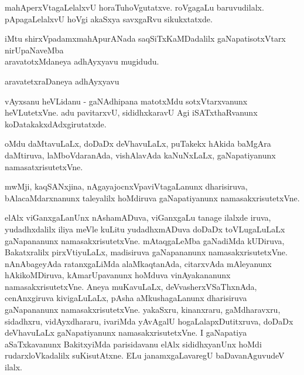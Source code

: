 \documentclass{article}
\begin{document}
\begin{mng}%
mahAperxVtagaLelalxvU horaTuhoVgutatxve. roVgagaLu baruvudilalx. pApagaLelalxvU hoVgi akaSxya savxgaRvu sikukxtatxde.
\end{mng}

\begin{center}
iMtu shirxVpadamxmahApurANada saqSiTxKaMDadalilx gaNapatisotxVtarx nirUpaNaveMba\\
aravatotxMdaneya adhAyxyavu mugidudu.
\end{center}

\begin{center}
{\textbf\large{aravatetxraDaneya adhAyxyavu}}
\end{center}

\begin{mng}%
vAyxsanu heVLidanu - gaNAdhipana matotxMdu sotxVtarxvanunx heVLutetxVne. adu pavitarxvU, sididhxkaravU Agi iSATxthaRvanunx koDatakakxdAdxgirutatxde.
\end{mng}

\begin{mng}%
oMdu daMtavuLaLx, doDaDx deVhavuLaLx, puTakekx hAkida baMgAra daMtiruva, laMboVdaranAda, vishAlavAda kaNuNxLaLx, gaNapatiyanunx namasatxrisutetxVne.
\end{mng}

\begin{mng}%
mwMji, kaqSANxjina, nAgayajocnxVpaviVtagaLanunx dharisiruva, bAlacaMdarxnanunx taleyalilx hoMdiruva gaNapatiyanunx namasakxrisutetxVne.
\end{mng}

\begin{mng}%
elAlx viGanxgaLanUnx nAshamADuva, viGanxgaLu tanage ilalxde iruva, yudadhxdalilx iliya meVle kuLitu yudadhxmADuva doDaDx toVLugaLuLaLx gaNapananunx namasakxrisutetxVne. mAtaqgaLeMba gaNadiMda kUDiruva, Bakatxralilx pirxVtiyuLaLx, madisiruva gaNapananunx namasakxrisutetxVne. nAnAbageyAda ratanxgaLiMda alaMkaqtanAda, citarxvAda mAleyanunx hAkikoMDiruva, kAmarUpavanunx hoMduva vinAyakananunx namasakxrisutetxVne. Aneya muKavuLaLx, deVvasherxVSaThxnAda, cenAnxgiruva kivigaLuLaLx, pAsha aMkushagaLanunx dharisiruva gaNapananunx namasakxrisutetxVne. yakaSxru, kinanxraru, gaMdharavxru, sidadhxru, vidAyxdhararu, ivariMda yAvAgalU hogaLalapxDutitxruva, doDaDx deVhavuLaLx gaNapatiyanunx namasakxrisutetxVne. I gaNapatiya aSaTxkavanunx BakitxyiMda parisidavanu elAlx sididhxyanUnx hoMdi rudarxloVkadalilx suKisutAtxne. ELu janamxgaLavaregU baDavanAguvudeV ilalx.
\end{mng}
\end{document}

